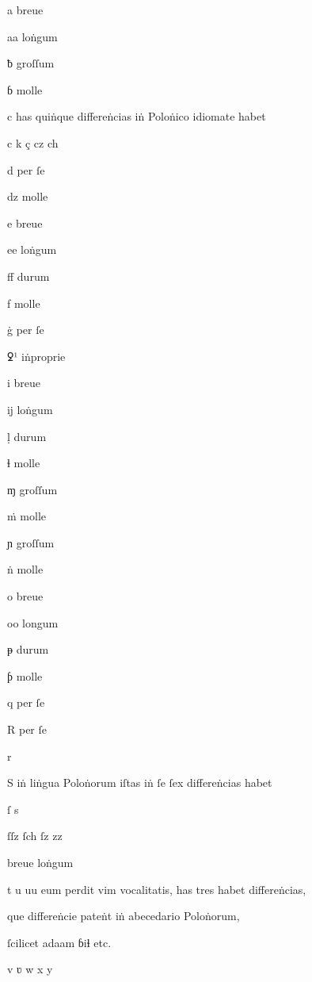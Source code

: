 {%





a breue 

aa loṅgum 

ƀ groſſum 

ɓ molle

c has quiṅque differeṅcias iṅ Poloṅico idiomate habet

c k ç cz ch

d per ſe 

dz molle 

e breue 

ee loṅgum 

ﬀ durum 

f molle




ġ per ſe 

ꝿ¹  iṅproprie 

i breue 

ĳ loṅgum 

ḷ durum 

ɬ molle 



ɱ groſſum 

ṁ molle 

ɲ  groſſum 

ṅ   molle 

o breue    

oo longum



ᵽ durum 

ƥ molle 

q per ſe 

R per ſe 

r

S iṅ liṅgua Poloṅorum iſtas iṅ ſe ſex differeṅcias habet

ſ s 

ſſz ſch ſz zz

breue	loṅgum


t u uu eum perdit vim vocalitatis, has tres habet differeṅcias, 

que differeṅcie pateṅt iṅ abecedario Poloṅorum, 

ſcilicet adaam ɓiɬ etc.

v ʋ w	x y

}

